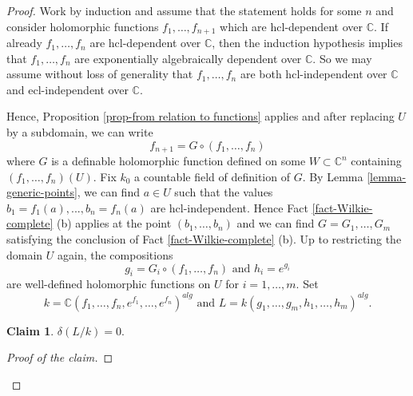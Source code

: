 \documentclass[12pt]{amsart}
\theoremstyle{definition}
\theoremstyle{plain}
\newtheorem*{claim}{Claim}
\theoremstyle{exampstyle}\newtheorem{thmx}{Theorem}
\theoremstyle{exampstyle}\newtheorem{thmxbis}{Theorem}
\begin{document}
\begin{proof} 
Work by induction and assume that the statement holds for some $n$ and consider holomorphic functions $f_1,\ldots,f_{n+1}$ which are $\mathrm{hcl}$-dependent over $\mathbb{C}$. If already $f_1,\ldots,f_n$ are $\mathrm{hcl}$-dependent over $\mathbb{C}$, then the induction hypothesis implies that $f_1,\ldots,f_{n}$ are exponentially algebraically dependent over $\mathbb{C}$. So we may assume without loss of generality that $f_1,\ldots,f_n$ are both $\mathrm{hcl}$-independent over $\mathbb{C}$ and $\mathrm{ecl}$-independent over $\mathbb{C}$. 

Hence, Proposition \ref{prop-from relation to functions} applies and after replacing $U$ by a subdomain, we can write 
\begin{equation}\label{equality-proof-equivalence} f_{n+1} = G \circ (f_1,\ldots,f_n) 
\end{equation}
where $G$ is a definable holomorphic function defined on some $W \subset \mathbb{C}^n$ containing $(f_1,\ldots,f_n)(U)$. Fix $k_0$ a countable field of definition of $G$. By Lemma \ref{lemma-generic-points}, we can find $a \in U$ such that the values $b_1 = f_1(a), ... , b_n = f_n(a)$ are $\mathrm{hcl}$-independent. Hence Fact \ref{fact-Wilkie-complete} (b) applies at the point $(b_1,\ldots,b_n)$ and we can find $G = G_1,\ldots,G_m$ satisfying the conclusion of Fact \ref{fact-Wilkie-complete} (b). Up to restricting the domain $U$ again, the compositions
$$g_i = G_i \circ (f_1,\ldots, f_n) \text{ and } h_i = e^{g_i}$$
are well-defined holomorphic functions on $U$ for $i =1,\ldots,m$. Set 
$$ k = \mathbb{C}(f_1,\ldots,f_n,e^{f_1},\ldots,e^{f_n})^{alg} \text{ and } L = k(g_1,\ldots,g_m, h_1,\ldots,h_m)^{alg}.$$

\begin{claim} 
$\delta(L/k) = 0.$
\end{claim} 


\begin{proof}[Proof of the claim]


\end{proof}
\end{proof}
\end{document}
